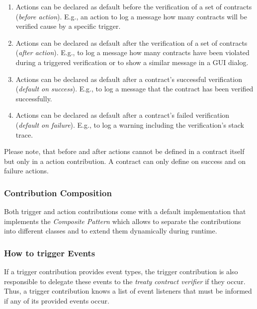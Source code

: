 \documentclass{llncs}
\begin{document}
\begin{enumerate}
	\item Actions can be declared as default before the verification of a set of contracts (\textit{before action}). E.g., an action to log a message how many contracts will be verified cause by a specific trigger.
	\item Actions can be declared as default after the verification of a set of contracts (\textit{after action}). E.g., to log a message how many contracts have been violated during a triggered verification or to show a similar message in a GUI dialog.
	\item Actions can be declared as default after a contract's successful verification (\textit{default on success}). E.g., to log a message that the contract has been verified successfully.
	\item Actions can be declared as default after a contract's failed verification (\textit{default on failure}). E.g., to log a warning including the verification's stack trace.
\end{enumerate}

Please note, that before and after actions cannot be defined in a contract itself but only in a action contribution. A contract can only define on success and on failure actions.

\subsubsection{Contribution Composition}

Both trigger and action contributions come with a default implementation that implements the \textit{Composite Pattern} \cite{GangOf4} which allows to separate the contributions into different classes and to extend them dynamically during runtime.

\subsubsection{How to trigger Events}

If a trigger contribution provides event types, the trigger contribution is also responsible to delegate these events to the \textit{treaty contract verifier} if they occur. Thus, a trigger contribution knows a list of event listeners that must be informed if any of its provided events occur. 
\end{document}
